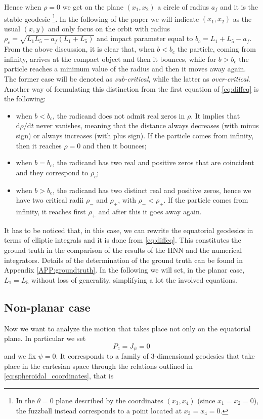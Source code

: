 \documentclass[prd,aps,a4paper,eqsecnum,nofootinbib,floatfix,twocolumn,superscriptaddress]{revtex4-2}
\begin{document}
Hence when $\rho = 0$ we get on the plane $(x_1,x_2)$ a circle of radius $a_f$ and it is the stable geodesic \footnote{In the $\theta = 0$ plane described by the coordinates $(x_3,x_4)$ (since $x_1=x_2=0$), the fuzzball instead corresponds to a point located at $x_3=x_4=0$.}. In the following of the paper we will indicate $(x_1,x_2)$ as the usual $(x,y)$ and only focus on the orbit with radius $\rho_{c} = \sqrt{L_1 L_5 - a_f (L_1+L_5)}$ and impact parameter equal to $b_c = L_1+L_5-a_f$. From the above discussion, it is clear that, when $b<b_c$ the particle, coming from infinity, arrives at the compact object and then it bounces, while for $b>b_c$ the particle reaches a minimum value of the radius and then it moves away again. The former case will be denoted as \textit{sub-critical}, while the latter as \textit{over-critical}.\\
Another way of formulating this distinction from the first equation of \eqref{eq:diffeq} is the following:
\begin{itemize}
    \item when $b<b_c$, the radicand does not admit real zeros in $\rho$. It implies that $\mathrm{d} \rho / \mathrm{d} t$ never vanishes, meaning that the distance always decreases (with minus sign) or always increases (with plus sign). If the particle comes from infinity, then it reaches $\rho = 0$ and then it bounces;
    \item when $b=b_c$, the radicand has two real and positive zeros that are coincident and they correspond to $\rho_c$;
    \item when $b>b_c$, the radicand has two distinct real and positive zeros, hence we have two critical radii $\rho_{-}$ and $\rho_{+}$, with $\rho_{-} < \rho_{+}$. If the particle comes from infinity, it reaches first $\rho_{+}$ and after this it goes away again.
\end{itemize}
It has to be noticed that, in this case, we can rewrite the equatorial geodesics in terms of elliptic integrals and it is done from \eqref{eq:diffeq}. This constitutes the ground truth in the comparison of the results of the HNN and the numerical integrators. Details of the determination of the ground truth can be found in Appendix \ref{APP:groundtruth}. 
In the following we will set, in the planar case, $L_1 = L_5$ without loss of generality, simplifying a lot the involved equations.

\subsection{Non-planar case}\label{Non-Planar Case}
Now we want to analyze the motion that takes place not only on the equatorial plane. In particular we set
\begin{equation}
    P_z = J_\psi = 0
\end{equation}
and we fix $\psi = 0$. It corresponds to a family of 3-dimensional geodesics that take place in the cartesian space through the relations outlined in \eqref{eq:spheroidal_coordinates}, that is
\end{document}
